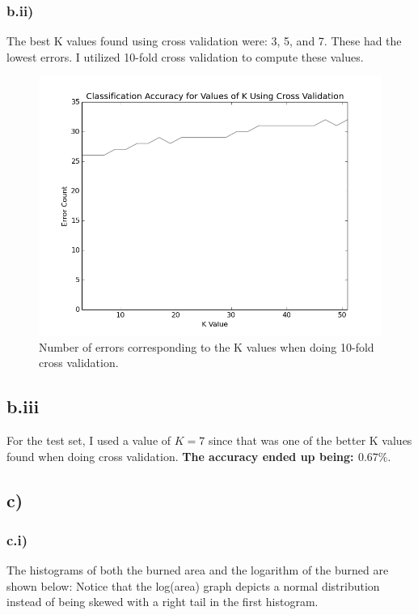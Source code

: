 \documentclass[12pt]{article}
\let\Oldsubsection\subsection
\renewcommand{\subsection}{\FloatBarrier\Oldsubsection}
\let\Oldsubsubsection\subsubsection
\renewcommand{\subsubsection}{\FloatBarrier\Oldsubsubsection}
\begin{document}
	\subsubsection*{b.ii)}
	The best K values found using cross validation were: 3, 5, and 7. These had the lowest errors. 
	I utilized 10-fold cross validation to compute these values.
	\begin{figure}[!htb]
	\begin{center}
	  \includegraphics[scale=0.5]{k-value-error.png}
	  \caption{Number of errors corresponding to the K values when doing 10-fold cross validation.}
	\end{center}
	\end{figure}

	\subsection*{b.iii}
	For the test set, I used a value of $K=7$ since that was one of the better K values found 
	when doing cross validation. \textbf{The accuracy ended up being: $0.67\%$}.

\subsection*{c)}

	\subsubsection*{c.i)}
	The histograms of both the burned area and the logarithm of the burned are shown below:
	Notice that the log(area) graph depicts a normal distribution instead of being 
	skewed with a right tail in the first histogram.
\end{document}
